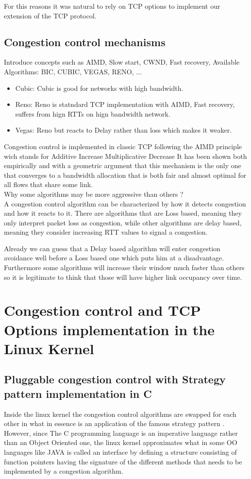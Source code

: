 \documentclass[type=bsc,accentcolor=tud9a,colorback,11pt,paper=a4report]{tudthesis}
\begin{document}
For this reasons it was natural to rely on TCP options to implement our
extension of the TCP protocol.
	\section{Congestion control mechanisms}
Introduce concepts such as AIMD, Slow start, CWND, Fast recovery, Available 
Algorithms: BIC, CUBIC, VEGAS, RENO, ...
\begin{itemize}
\item Cubic: Cubic is good for networks with high bandwidth.
\item Reno: Reno is statndard TCP implementation with AIMD, Fast recovery,
	suffers from hign RTTs on hign bandwidth network.
\item Vegas: Reno but reacts to Delay rather than loss which makes it weaker.
\end{itemize}
Congestion control is implemented in classic TCP following the AIMD principle 
wich 
stands for Additive Increase Multiplicative Decrease
It has been shown both empirically and with a geometric argument 
\cite{tannenbaum} that 
this mechanism is the only one that converges to a bandwidth allocation that is
both fair and almost optimal for all flows that share some link.
\\Why some algorithms may be more aggressive than others ?\\
A congestion control algorithm can be characterized by how it detects congestion
and how it reacts to it. There are algorithms that are Loss based, meaning
they only interpret packet loss as congestion, while other algorithms are
delay based, meaning they consider increasing RTT values to signal a congestion.

Already we can guess that a Delay based algorithm will enter congestion avoidance
well before a Loss based one which puts him at a disadvantage. Furthermore some
algorithms will increase their window much faster than others so it is legitimate
to think that those will have higher link occupancy over time.
\chapter{Congestion control and TCP Options implementation in the Linux Kernel}
\section{Pluggable congestion control with Strategy pattern implementation in C}
Inside the linux kernel the congestion control algorithms are swapped for each 
other in what in essence is an application of the famous strategy pattern 
\cite{gamma}. However, since The C programming language is an imperative 
language 
rather than an Object Oriented one, the linux kernel approximates what in some
OO languages like JAVA is called an interface by defining a structure 
consisting of function pointers having the signature of the different methods 
that needs to be implemented by a congestion algorithm. 
\end{document}
